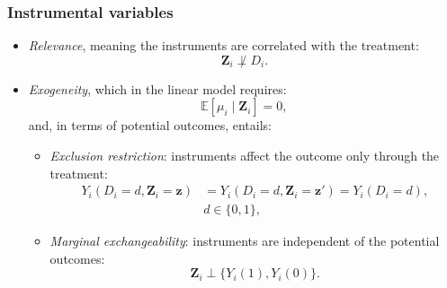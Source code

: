 \documentclass[12pt, compress]{beamer}
\begin{document}
\begin{frame}
	\frametitle{Instrumental variables}
\begin{itemize}
	\item \textit{Relevance}, meaning the instruments are correlated with the treatment:
	\[
	\mathbf{Z}_i \not\perp D_i.
	\]
	\item \textit{Exogeneity}, which in the linear model requires:
	\begin{equation*}
		\mathbb{E}[\mu_i \mid \mathbf{Z}_i] = 0,
	\end{equation*}
	and, in terms of potential outcomes, entails:
	\begin{itemize}
		\item \textit{Exclusion restriction}: instruments affect the outcome only through the treatment:
		\begin{align*}
		    Y_i(D_i = d, \mathbf{Z}_i = \mathbf{z}) & = Y_i(D_i = d, \mathbf{Z}_i = \mathbf{z}') = Y_i(D_i = d),\\
            &d \in \{0,1\},
		\end{align*}
			
		\item \textit{Marginal exchangeability}: instruments are independent of the potential outcomes:
		\[
		\mathbf{Z}_i \perp \{ Y_i(1), Y_i(0) \}.
		\]
	\end{itemize}
\end{itemize}

\end{frame}
\end{document}
